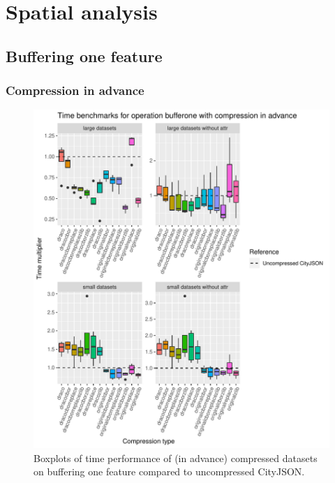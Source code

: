 \newpage

\section{Spatial analysis}
\label{bmbuffering}

\subsection{Buffering one feature}


\subsubsection{Compression in advance}

\begin{figure}[h!]
    \includegraphics[scale=0.92]{figs/benchmark/individual/bufferone.pdf}
    \caption{Boxplots of time performance of (in advance) compressed datasets on buffering one feature compared to uncompressed CityJSON.}
    \label{fig:sdvis}
\end{figure}

